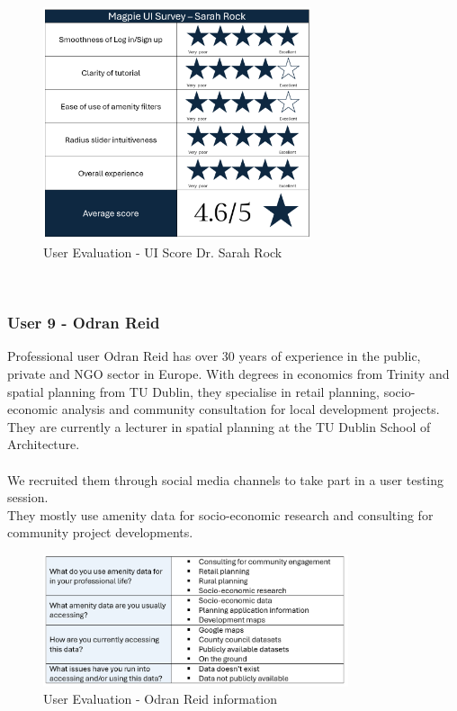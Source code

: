 \begin{figure}[h!]
    \centering
    \includegraphics[width=0.7\textwidth]{images/survey-sarah.png}
    \caption{User Evaluation - UI Score Dr. Sarah Rock}
\end{figure}\\


\newpage
\subsubsection{User 9 - Odran Reid}
Professional user Odran Reid has over 30 years of experience in the public, private and NGO sector in Europe. With degrees in economics from Trinity and spatial planning from TU Dublin, they specialise in retail planning, socio-economic analysis and community consultation for local development projects. They are currently a lecturer in spatial planning at the TU Dublin School of Architecture.\\ \\
We recruited them through social media channels to take part in a user testing session.\\
They mostly use amenity data for socio-economic research and consulting for community project developments.\\
\begin{figure}[h!]
    \centering
    \includegraphics[width=0.8\textwidth]{images/odran-amenity-info.png}
    \caption{User Evaluation - Odran Reid information}
\end{figure}

